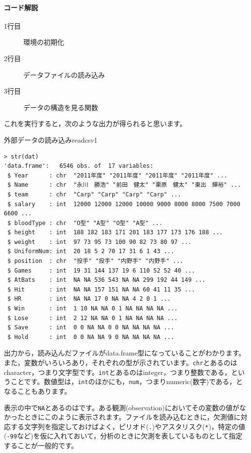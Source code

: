 \documentclass{ltjsbook}
\begin{document}
\paragraph{コード解説}
\begin{description}
	\item[1行目] 環境の初期化
	\item[2行目] データファイルの読み込み
	\item[3行目] データの構造を見る関数
\end{description}

これを実行すると，次のような出力が得られると思います。
\begin{Rscreen}{外部データの読み込み}{readcsv1}
\begin{verbatim}
> str(dat)
'data.frame':	6546 obs. of  17 variables:
 $ Year      : chr  "2011年度" "2011年度" "2011年度" "2011年度" ...
 $ Name      : chr  "永川　勝浩" "前田　健太" "栗原　健太" "東出　輝裕" ...
 $ team      : chr  "Carp" "Carp" "Carp" "Carp" ...
 $ salary    : int  12000 12000 12000 10000 9000 8000 8000 7500 7000 6600 ...
 $ bloodType : chr  "O型" "A型" "O型" "A型" ...
 $ height    : int  188 182 183 171 201 183 177 173 176 188 ...
 $ weight    : int  97 73 95 73 100 90 82 73 80 97 ...
 $ UniformNum: int  20 18 5 2 70 17 31 6 1 43 ...
 $ position  : chr  "投手" "投手" "内野手" "内野手" ...
 $ Games     : int  19 31 144 137 19 6 110 52 52 40 ...
 $ AtBats    : int  NA NA 536 543 NA NA 299 192 44 149 ...
 $ Hit       : int  NA NA 157 151 NA NA 60 41 11 35 ...
 $ HR        : int  NA NA 17 0 NA NA 4 2 0 1 ...
 $ Win       : int  1 10 NA NA 0 1 NA NA NA NA ...
 $ Lose      : int  2 12 NA NA 0 1 NA NA NA NA ...
 $ Save      : int  0 0 NA NA 0 0 NA NA NA NA ...
 $ Hold      : int  0 0 NA NA 9 0 NA NA NA NA ...
\end{verbatim}
\end{Rscreen}
出力から，読み込んだファイルがdata.frame型になっていることがわかります。また，変数がいろいろあり，それぞれの型が示されています。\verb|chr|とあるのはcharacter，つまり文字型です。\verb|int|とあるのはinteger，つまり整数である，ということです。数値型は，\verb|int|のほかにも，\verb|num|，つまりnumeric(数字)である，となることもあります。

表示の中で\verb|NA|とあるのはです。ある観測(observation)においてその変数の値がなかったときにこのように表示されます。ファイルを読み込むときに，欠測値に対応する文字列を指定しておけばよく，ピリオド(\verb|.|)やアスタリスク(\verb|*|)，特定の値(\verb|-99|など)を仮に入れておいて，分析のときに欠測を表しているものとして指定することが一般的です。
\end{document}
